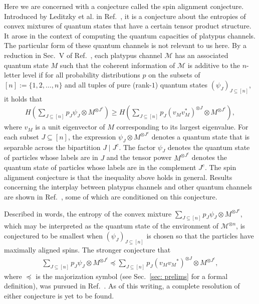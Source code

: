 \documentclass[12pt]{article}
\theoremstyle{definition}
\numberwithin{equation}{section}
\numberwithin{equation}{section}
\newcommand{\cM}{\mathcal{M}}
\begin{document}
Here we are concerned with a conjecture called the spin alignment conjecture. Introduced by Leditzky et al. in Ref.~\cite{Leditzky_2023}, it is a conjecture about the entropies of convex mixtures of quantum states that have a certain tensor product structure. It arose in the context of computing the quantum capacities of platypus channels. The particular form of these quantum channels is not relevant to us here. By a reduction in Sec.~V of Ref.~\cite{Leditzky_2023}, each platypus channel \(\cM\) has an associated quantum state \(M\) such that the coherent information of \(\cM\) is additive to the \(n\)-letter level if for all probability distributions \(p\) on the subsets of \([n]:=\{1,2,\ldots, n\}\) and all tuples of pure (rank-\(1\)) quantum states \((\psi_J)_{J \subseteq [n]}\), it holds that
\begin{align}
\label{eq: align entropy}
H(\sum_{J \subseteq [n]} p_{J}\psi_{J} \otimes M^{\otimes J^c}) \geq H(\sum_{J \subseteq [n]} p_{J}(v_M v_M^*)^{\otimes J} \otimes M^{\otimes J^c}), 
\end{align}
where \(v_M\) is a unit eigenvector of \(M\) corresponding to its largest eigenvalue. For each subset \(J \subseteq[n]\), the expression \(\psi_J \otimes M^{\otimes J^c}\) denotes a quantum state that is separable across the bipartition \(J \mid J^c\). The factor \(\psi_J\) denotes the quantum state of particles whose labels are in \(J\) and the tensor power \(M^{\otimes J^c}\) denotes the quantum state of particles whose labels are in the complement \(J^c\). The spin alignment conjecture is that the inequality above holds in general. Results concerning the interplay between platypus channels and other quantum channels are shown in Ref.~\cite{Leditzky2022b}, some of which are conditioned on this conjecture.




Described in words, the entropy of the convex mixture \(\sum_{J \subseteq[n]} p_{J}\psi_{J} \otimes M^{\otimes J^c}\), which may be interpreted as the quantum state of the environment of \(\cM^{\otimes n}\), is conjectured to be smallest when \((\psi_J)_{J \subseteq[n]}\) is chosen so that the particles have maximally aligned spins. The stronger conjecture that 
\begin{align}
\label{rel: spin alignment maj}
\sum_{J \subseteq [n]} p_{J}\psi_{J} \otimes M^{\otimes J^c} \preceq \sum_{J \subseteq [n]} p_{J}({v_M} {v_M}^*)^{\otimes J}  \otimes M^{\otimes J^c},
\end{align}
where \(\preceq\) is the majorization symbol (see Sec.~\ref{sec: prelims} for a formal definition), was pursued in Ref.~\cite{Alhejji2024}. As of this writing, a complete resolution of either conjecture is yet to be found.  
\end{document}
